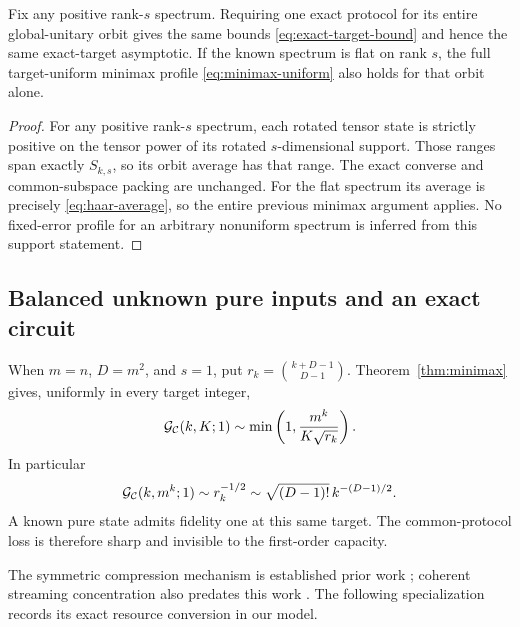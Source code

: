 \begin{corollary}\label{cor:known-spectrum}
Fix any positive rank-$s$ spectrum. Requiring one exact protocol for its entire global-unitary orbit gives the same bounds \eqref{eq:exact-target-bound} and hence the same exact-target asymptotic. If the known spectrum is flat on rank $s$, the full target-uniform minimax profile \eqref{eq:minimax-uniform} also holds for that orbit alone.
\end{corollary}
\begin{proof}
For any positive rank-$s$ spectrum, each rotated tensor state is strictly positive on the tensor power of its rotated $s$-dimensional support. Those ranges span exactly $S_{k,s}$, so its orbit average has that range. The exact converse and common-subspace packing are unchanged. For the flat spectrum its average is precisely \eqref{eq:haar-average}, so the entire previous minimax argument applies. No fixed-error profile for an arbitrary nonuniform spectrum is inferred from this support statement.
\end{proof}

\subsection{Balanced unknown pure inputs and an exact circuit}
When $m=n$, $D=m^2$, and $s=1$, put $r_k=\binom{k+D-1}{D-1}$. Theorem~\ref{thm:minimax} gives, uniformly in every target integer,
\[
 \mathcal G_{\mathcal C}(k,K;1)\sim\min\left(1,\frac{m^k}{K\sqrt{r_k}}\right).
\]
In particular
\begin{equation}\label{eq:pure-full-output}
 \mathcal G_{\mathcal C}(k,m^k;1)\sim r_k^{-1/2}
 \sim\sqrt{(D-1)!}\,k^{-(D-1)/2}.
\end{equation}
A known pure state admits fidelity one at this same target. The common-protocol loss is therefore sharp and invisible to the first-order capacity.

The symmetric compression mechanism is established prior work \cite{plesch,baertschi,chen}; coherent streaming concentration also predates this work \cite{streaming}. The following specialization records its exact resource conversion in our model.

